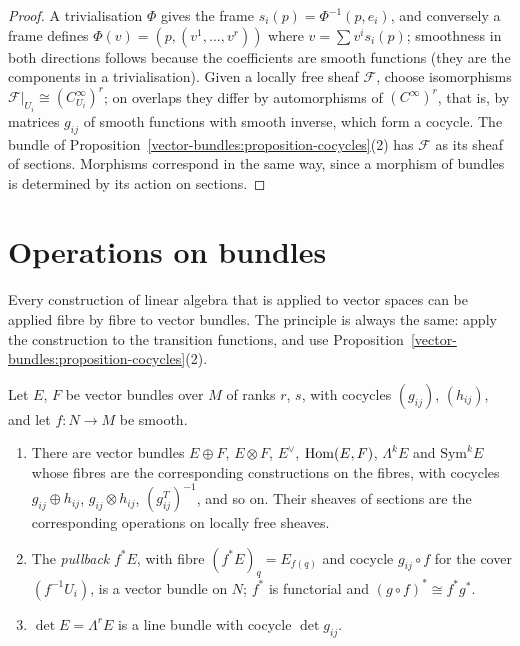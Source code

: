 \begin{proof}
A trivialisation $\Phi$ gives the frame $s_i(p) = \Phi^{-1}(p, e_i)$, and conversely a frame defines $\Phi(v) = (p, (v^1, \ldots, v^r))$ where $v = \sum v^is_i(p)$; smoothness in both directions follows because
the coefficients are smooth functions (they are the components in a trivialisation). Given a locally free sheaf $\mathcal{F}$, choose isomorphisms $\mathcal{F}|_{U_i} \cong (C^\infty_{U_i})^r$; on overlaps
they differ by automorphisms of $(C^\infty)^r$, that is, by matrices $g_{ij}$ of smooth functions with smooth inverse, which form a cocycle. The bundle of
Proposition~\ref{vector-bundles:proposition-cocycles}(2) has $\mathcal{F}$ as its sheaf of sections. Morphisms correspond in the same way, since a morphism of bundles is determined by its action on sections.
\end{proof}

\section{Operations on bundles}\label{vector-bundles:section-operations}

Every construction of linear algebra that is applied to vector spaces can be applied fibre by fibre to vector bundles. The principle is always the same: apply the construction to
the transition functions, and use Proposition~\ref{vector-bundles:proposition-cocycles}(2).

\begin{proposition}\label{vector-bundles:proposition-operations}
Let $E$, $F$ be vector bundles over $M$ of ranks $r$, $s$, with cocycles $(g_{ij})$, $(h_{ij})$, and let $f \colon N \to M$ be smooth.
\begin{enumerate}
\item There are vector bundles $E \oplus F$, $E \otimes F$, $E^\vee$, $\operatorname{Hom}(E, F)$, $\Lambda^kE$ and $\mathrm{Sym}^kE$ whose fibres are the corresponding constructions on the fibres, with cocycles
$g_{ij} \oplus h_{ij}$, $g_{ij} \otimes h_{ij}$, $(g_{ij}^T)^{-1}$, and so on. Their sheaves of sections are the corresponding operations on locally free sheaves.
\item The \emph{pullback} $f^*E$, with fibre $(f^*E)_q = E_{f(q)}$ and cocycle $g_{ij} \circ f$ for the cover $(f^{-1}U_i)$, is a vector bundle on $N$; $f^*$ is functorial and
$(g \circ f)^* \cong f^*g^*$.
\item $\det E = \Lambda^rE$ is a line bundle with cocycle $\det g_{ij}$.
\end{enumerate}
\end{proposition}

